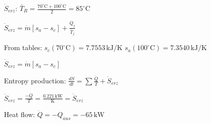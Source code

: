 \( \dot{S}_{erz} \):  
\( \bar{T}_R = \frac{70^\circ \text{C} + 100^\circ \text{C}}{2} = 85^\circ \text{C} \)  

\( \dot{S}_{erz} = \dot{m} \left[ s_a - s_c \right] + \frac{\dot{Q}_j}{\bar{T}_j} \)  

From tables:  
\( s_c (70^\circ \text{C}) = 7.7553 \, \text{kJ/K} \)  
\( s_a (100^\circ \text{C}) = 7.3540 \, \text{kJ/K} \)  

\( \dot{S}_{erz} = \dot{m} \left[ s_a - s_c \right] \)  

Entropy production:  
\( \frac{dS}{dt} = \sum \frac{\dot{Q}}{T} + \dot{S}_{erz} \)  

\( \dot{S}_{erz} = \frac{-\dot{Q}}{T} = \frac{0.221 \, \text{kW}}{\text{K}} = \dot{S}_{erz} \)  

Heat flow:  
\( \dot{Q} = -Q_{aus} = -65 \, \text{kW} \)